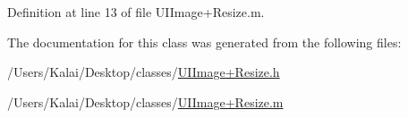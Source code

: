 Definition at line 13 of file U\-I\-Image+\-Resize.\-m.



The documentation for this class was generated from the following files\-:\begin{DoxyCompactItemize}
\item 
/\-Users/\-Kalai/\-Desktop/classes/\hyperlink{_u_i_image_09_resize_8h}{U\-I\-Image+\-Resize.\-h}\item 
/\-Users/\-Kalai/\-Desktop/classes/\hyperlink{_u_i_image_09_resize_8m}{U\-I\-Image+\-Resize.\-m}\end{DoxyCompactItemize}
